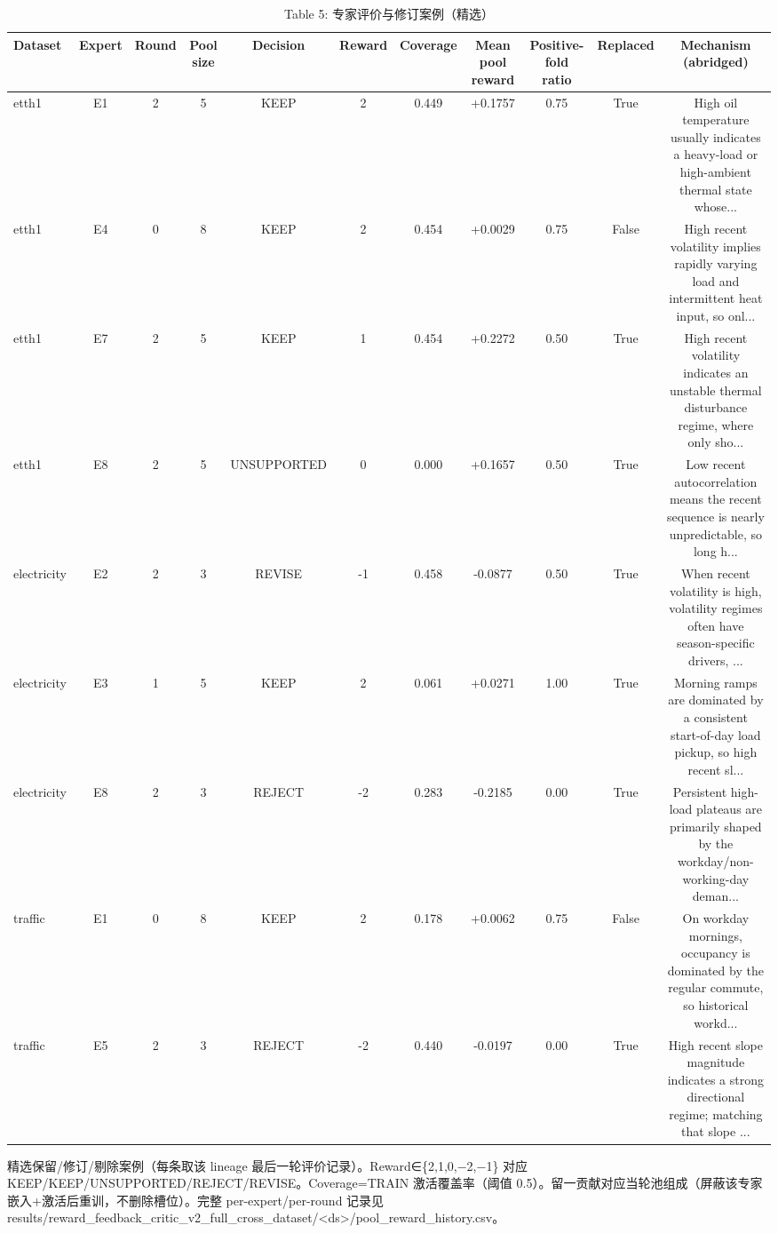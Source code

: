 \begin{table}[htbp]
  \centering
  \caption{Table 5: 专家评价与修订案例（精选）}
  \label{tab:cases}
  \begin{tabular}{lcccccccccc}
    \toprule
    Dataset & Expert & Round & Pool size & Decision & Reward & Coverage & Mean pool reward & Positive-fold ratio & Replaced & Mechanism (abridged) \\
    \midrule
    etth1 & E1 & 2 & 5 & KEEP & 2 & 0.449 & +0.1757 & 0.75 & True & High oil temperature usually indicates a heavy-load or high-ambient thermal state whose... \\
    etth1 & E4 & 0 & 8 & KEEP & 2 & 0.454 & +0.0029 & 0.75 & False & High recent volatility implies rapidly varying load and intermittent heat input, so onl... \\
    etth1 & E7 & 2 & 5 & KEEP & 1 & 0.454 & +0.2272 & 0.50 & True & High recent volatility indicates an unstable thermal disturbance regime, where only sho... \\
    etth1 & E8 & 2 & 5 & UNSUPPORTED & 0 & 0.000 & +0.1657 & 0.50 & True & Low recent autocorrelation means the recent sequence is nearly unpredictable, so long h... \\
    electricity & E2 & 2 & 3 & REVISE & -1 & 0.458 & -0.0877 & 0.50 & True & When recent volatility is high, volatility regimes often have season-specific drivers, ... \\
    electricity & E3 & 1 & 5 & KEEP & 2 & 0.061 & +0.0271 & 1.00 & True & Morning ramps are dominated by a consistent start-of-day load pickup, so high recent sl... \\
    electricity & E8 & 2 & 3 & REJECT & -2 & 0.283 & -0.2185 & 0.00 & True & Persistent high-load plateaus are primarily shaped by the workday/non-working-day deman... \\
    traffic & E1 & 0 & 8 & KEEP & 2 & 0.178 & +0.0062 & 0.75 & False & On workday mornings, occupancy is dominated by the regular commute, so historical workd... \\
    traffic & E5 & 2 & 3 & REJECT & -2 & 0.440 & -0.0197 & 0.00 & True & High recent slope magnitude indicates a strong directional regime; matching that slope ... \\
    \bottomrule
  \end{tabular}
  {\footnotesize 精选保留/修订/剔除案例（每条取该 lineage 最后一轮评价记录）。Reward∈\{2,1,0,−2,−1\} 对应 KEEP/KEEP/UNSUPPORTED/REJECT/REVISE。Coverage=TRAIN 激活覆盖率（阈值 0.5）。留一贡献对应当轮池组成（屏蔽该专家嵌入+激活后重训，不删除槽位）。完整 per-expert/per-round 记录见 results/reward\_feedback\_critic\_v2\_full\_cross\_dataset/<ds>/pool\_reward\_history.csv。}
\end{table}
